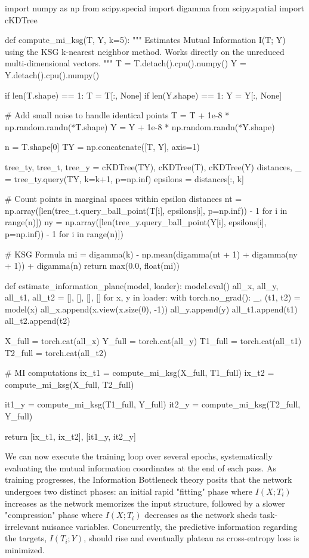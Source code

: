 \begin{pycode}
import numpy as np
from scipy.special import digamma
from scipy.spatial import cKDTree

def compute_mi_ksg(T, Y, k=5):
    """
    Estimates Mutual Information I(T; Y) using the KSG k-nearest neighbor method.
    Works directly on the unreduced multi-dimensional vectors.
    """
    T = T.detach().cpu().numpy()
    Y = Y.detach().cpu().numpy()
    
    if len(T.shape) == 1:
        T = T[:, None]
    if len(Y.shape) == 1:
        Y = Y[:, None]
        
    # Add small noise to handle identical points
    T = T + 1e-8 * np.random.randn(*T.shape)
    Y = Y + 1e-8 * np.random.randn(*Y.shape)
        
    n = T.shape[0]
    TY = np.concatenate([T, Y], axis=1)
    
    tree_ty, tree_t, tree_y = cKDTree(TY), cKDTree(T), cKDTree(Y)
    distances, _ = tree_ty.query(TY, k=k+1, p=np.inf)
    epsilons = distances[:, k]
    
    # Count points in marginal spaces within epsilon distances
    nt = np.array([len(tree_t.query_ball_point(T[i], epsilons[i], p=np.inf)) - 1 for i in range(n)])
    ny = np.array([len(tree_y.query_ball_point(Y[i], epsilons[i], p=np.inf)) - 1 for i in range(n)])
    
    # KSG Formula
    mi = digamma(k) - np.mean(digamma(nt + 1) + digamma(ny + 1)) + digamma(n)
    return max(0.0, float(mi))

def estimate_information_plane(model, loader):
    model.eval()
    all_x, all_y, all_t1, all_t2 = [], [], [], []
    for x, y in loader:
        with torch.no_grad():
            _, (t1, t2) = model(x)
            all_x.append(x.view(x.size(0), -1))
            all_y.append(y)
            all_t1.append(t1)
            all_t2.append(t2)
            
    X_full = torch.cat(all_x)
    Y_full = torch.cat(all_y)
    T1_full = torch.cat(all_t1)
    T2_full = torch.cat(all_t2)
    
    # MI computations
    ix_t1 = compute_mi_ksg(X_full, T1_full)
    ix_t2 = compute_mi_ksg(X_full, T2_full)
    
    it1_y = compute_mi_ksg(T1_full, Y_full)
    it2_y = compute_mi_ksg(T2_full, Y_full)
    
    return [ix_t1, ix_t2], [it1_y, it2_y]
\end{pycode}

We can now execute the training loop over several epochs, systematically evaluating the mutual information coordinates at the end of each pass. As training progresses, the Information Bottleneck theory posits that the network undergoes two distinct phases: an initial rapid "fitting" phase where $I(X; T_i)$ increases as the network memorizes the input structure, followed by a slower "compression" phase where $I(X; T_i)$ decreases as the network sheds task-irrelevant nuisance variables. Concurrently, the predictive information regarding the targets, $I(T_i; Y)$, should rise and eventually plateau as cross-entropy loss is minimized.

